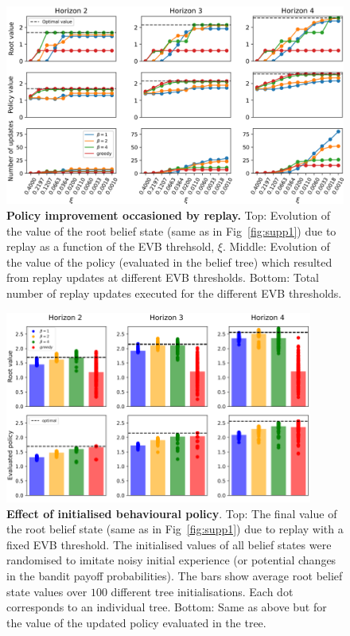 \begin{figure}[h!]
    \centering
    \includegraphics[width=1\textwidth]{Figures/supp/supp2.png}
    \caption{\textbf{Policy improvement occasioned by replay.} Top: Evolution of the value of the root belief state (same as in Fig~\ref{fig:supp1}) due to replay as a function of the EVB threhsold, $\xi$. Middle: Evolution of the value of the policy (evaluated in the belief tree) which resulted from replay updates at different EVB thresholds. Bottom: Total number of replay updates executed for the different EVB thresholds.}
    \label{fig:supp2}
\end{figure}

\begin{figure}[h!]
    \centering
    \includegraphics[width=0.9\textwidth]{Figures/supp/supp3.png}
    \caption{\textbf{Effect of initialised behavioural policy}. Top: The final value of the root belief state (same as in Fig~\ref{fig:supp1}) due to replay with a fixed EVB threshold. The initialised values of all belief states were randomised to imitate noisy initial experience (or potential changes in the bandit payoff probabilities). The bars show average root belief state values over $100$ different tree initialisations. Each dot corresponds to an individual tree. Bottom: Same as above but for the value of the updated policy evaluated in the tree.}
    \label{fig:supp3}
\end{figure}

